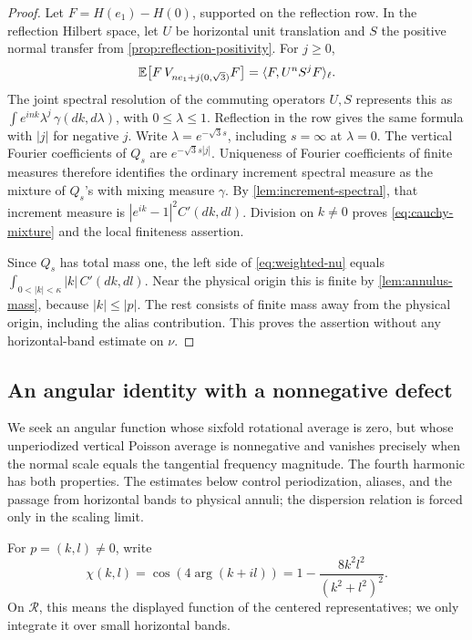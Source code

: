 \begin{proof}
Let \(F=H(e_1)-H(0)\), supported on the reflection row. In the reflection
Hilbert space, let \(U\) be horizontal unit translation and \(S\) the positive
normal transfer from \cref{prop:reflection-positivity}. For \(j\ge0\),
\[
 \mathbb E\big[F\,V_{ne_1+j(0,\sqrt3)}F\big]
       =\langle F,U^nS^jF\rangle_\ell.
\]
The joint spectral resolution of the commuting operators \(U,S\) represents
this as \(\int e^{ink}\lambda^j\,\gamma(dk,d\lambda)\), with
\(0\le\lambda\le1\). Reflection in the row gives the same formula with
\(|j|\) for negative \(j\). Write
\(\lambda=e^{-\sqrt3s}\), including \(s=\infty\) at \(\lambda=0\).
The vertical Fourier coefficients of \(Q_s\) are
\(e^{-\sqrt3s|j|}\). Uniqueness of Fourier coefficients of finite measures
therefore identifies the ordinary increment spectral measure as the mixture
of \(Q_s\)'s with mixing measure \(\gamma\). By
\cref{lem:increment-spectral}, that increment measure is
\(|e^{ik}-1|^2 C'(dk,dl)\). Division on \(k\ne0\) proves
\cref{eq:cauchy-mixture} and the local finiteness assertion.

Since \(Q_s\) has total mass one, the left side of
\cref{eq:weighted-nu} equals \(\int_{0<|k|<\kappa}|k|\,C'(dk,dl)\).
Near the physical origin this is finite by \cref{lem:annulus-mass}, because
\(|k|\le|p|\). The rest consists of finite mass away from the physical
origin, including the alias contribution. This proves the assertion without
any horizontal-band estimate on \(\nu\).
\end{proof}

\subsection{An angular identity with a nonnegative defect}

We seek an angular function whose sixfold rotational average is zero,
but whose unperiodized vertical Poisson average is nonnegative and vanishes precisely
when the normal scale equals the tangential frequency magnitude.  The
fourth harmonic has both properties.  The estimates below control
periodization, aliases, and the passage from horizontal bands to physical
annuli; the dispersion relation is forced only in the scaling limit.

For \(p=(k,l)\ne0\), write
\[
 \chi(k,l)=\cos(4\arg(k+il))
          =1-\frac{8k^2l^2}{(k^2+l^2)^2}.
\]
On \(\mathcal R\), this means the displayed function of the centered
representatives; we only integrate it over small horizontal bands.


